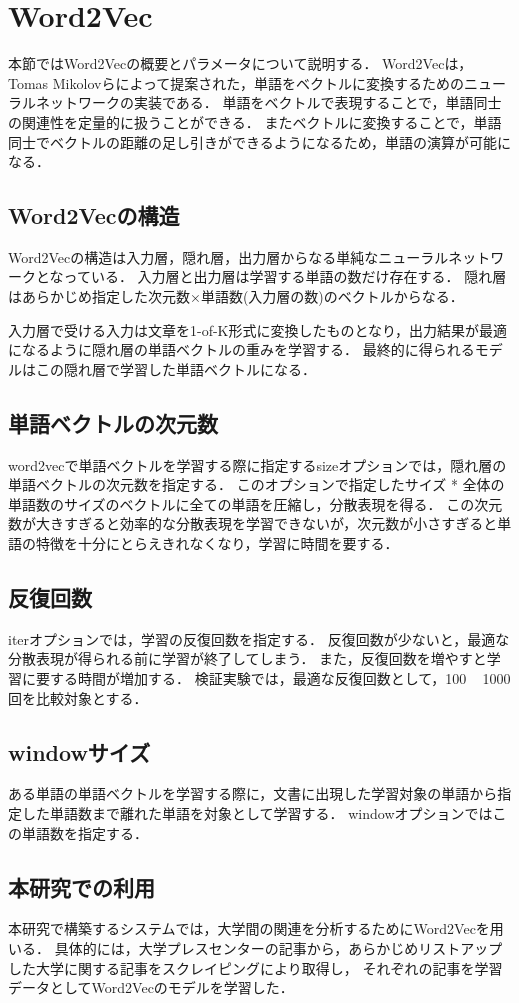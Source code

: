 \section{Word2Vec}
本節ではWord2Vecの概要とパラメータについて説明する．
Word2Vec\cite{word2vecBook}は，Tomas Mikolovら\cite{word2vec}によって提案された，単語をベクトルに変換するためのニューラルネットワークの実装である．
単語をベクトルで表現することで，単語同士の関連性を定量的に扱うことができる．
またベクトルに変換することで，単語同士でベクトルの距離の足し引きができるようになるため，単語の演算が可能になる．

\subsection{Word2Vecの構造}
Word2Vecの構造は入力層，隠れ層，出力層からなる単純なニューラルネットワークとなっている．
入力層と出力層は学習する単語の数だけ存在する．
隠れ層はあらかじめ指定した次元数×単語数(入力層の数)のベクトルからなる．

入力層で受ける入力は文章を1-of-K形式に変換したものとなり，出力結果が最適になるように隠れ層の単語ベクトルの重みを学習する．
最終的に得られるモデルはこの隠れ層で学習した単語ベクトルになる．

\subsection{単語ベクトルの次元数}
word2vecで単語ベクトルを学習する際に指定するsizeオプションでは，隠れ層の単語ベクトルの次元数を指定する．
このオプションで指定したサイズ * 全体の単語数のサイズのベクトルに全ての単語を圧縮し，分散表現を得る．
この次元数が大きすぎると効率的な分散表現を学習できないが，次元数が小さすぎると単語の特徴を十分にとらえきれなくなり，学習に時間を要する．

\subsection{反復回数}
iterオプションでは，学習の反復回数を指定する．
反復回数が少ないと，最適な分散表現が得られる前に学習が終了してしまう．
また，反復回数を増やすと学習に要する時間が増加する．
検証実験では，最適な反復回数として，100 ~ 1000回を比較対象とする．

\subsection{windowサイズ}
ある単語の単語ベクトルを学習する際に，文書に出現した学習対象の単語から指定した単語数まで離れた単語を対象として学習する．
windowオプションではこの単語数を指定する．


\subsection{本研究での利用}
本研究で構築するシステムでは，大学間の関連を分析するためにWord2Vecを用いる．
具体的には，大学プレスセンター\cite{pressCenter}の記事から，あらかじめリストアップした大学に関する記事をスクレイピングにより取得し，
それぞれの記事を学習データとしてWord2Vecのモデルを学習した．